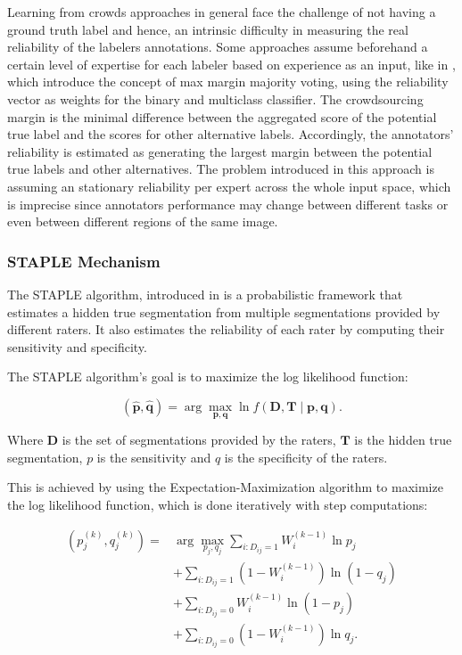 Learning from crowds approaches in general face the challenge of
not having a ground truth label and hence, an intrinsic difficulty in
measuring the real reliability of the labelers annotations. Some
approaches assume beforehand a certain level of expertise for each
labeler based on experience as an input, like in
\cite{TianEtZhu2015}, which introduce the concept of max margin
majority voting, using the reliability vector as weights for the
binary and multiclass classifier. The crowdsourcing
margin is the minimal difference between the aggregated score of the
potential true label and the scores for other alternative labels.
Accordingly, the annotators' reliability is estimated as generating
the largest margin between the potential true labels and other
alternatives. The problem introduced in this approach is assuming an
stationary reliability per expert across the whole input space, which
is imprecise since annotators performance may change between
different tasks or even between different regions of the same image.

\subsubsection{STAPLE Mechanism}

The \gls{STAPLE} algorithm, introduced in \cite{WarfieldEtAl2004}
is a probabilistic framework that estimates a hidden true
segmentation from multiple segmentations provided by
different raters. It also estimates the reliability of each rater by
computing their sensitivity and specificity.

The \gls{STAPLE} algorithm's goal is to maximize the log likelihood function:

\begin{equation}\label{eq:staple_likelilhood}
  (\hat{\mathbf{p}}, \hat{\mathbf{q}}) = \arg\max_{\mathbf{p}, \mathbf{q}} \ln
  f(\mathbf{D},
  \mathbf{T} \mid \mathbf{p}, \mathbf{q}).
\end{equation}

Where $\mathbf{D}$ is the set of segmentations provided by the raters,
$\mathbf{T}$ is the hidden true segmentation, $p$ is the sensitivity
and $q$ is the specificity of the raters.

This is achieved by using the Expectation-Maximization algorithm to
maximize the log likelihood function, which is done iteratively
with step computations:

\begin{equation}
  \label{eq:staple_em_step}
  \begin{split}
    (p_j^{(k)}, q_j^{(k)}) = & \arg\max_{p_j, q_j} \sum_{i:D_{ij}=1}
    W_i^{(k-1)} \ln p_j \\
    &+ \sum_{i:D_{ij}=1} \left(1 - W_i^{(k-1)}\right) \ln (1 - q_j) \\
    &+ \sum_{i:D_{ij}=0} W_i^{(k-1)} \ln (1 - p_j) \\
    &+ \sum_{i:D_{ij}=0} \left(1 - W_i^{(k-1)}\right) \ln q_j.
  \end{split}
\end{equation}


